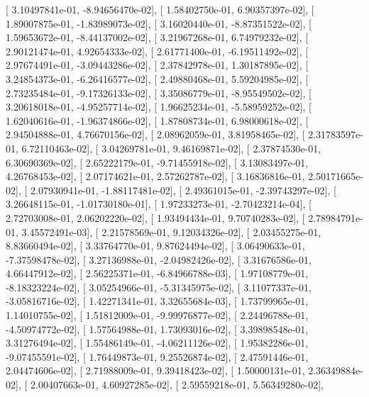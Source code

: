 \documentclass{article}
\begin{document}
       [  3.10497841e-01,  -8.94656470e-02],
       [  1.58402750e-01,   6.90357397e-02],
       [  1.89007875e-01,  -1.83989073e-02],
       [  3.16020440e-01,  -8.87351522e-02],
       [  1.59653672e-01,  -8.44137002e-02],
       [  3.21967268e-01,   6.74979232e-02],
       [  2.90121474e-01,   4.92654333e-02],
       [  2.61771400e-01,  -6.19511492e-02],
       [  2.97674491e-01,  -3.09443286e-02],
       [  2.37842978e-01,   1.30187895e-02],
       [  3.24854373e-01,  -6.26416577e-02],
       [  2.49880468e-01,   5.59204985e-02],
       [  2.73235484e-01,  -9.17326133e-02],
       [  3.35086779e-01,  -8.95549502e-02],
       [  3.20618018e-01,  -4.95257714e-02],
       [  1.96625234e-01,  -5.58959252e-02],
       [  1.62040616e-01,  -1.96374866e-02],
       [  1.87808734e-01,   6.98000618e-02],
       [  2.94504888e-01,   4.76670156e-02],
       [  2.08962059e-01,   3.81958465e-02],
       [  2.31783597e-01,   6.72110463e-02],
       [  3.04269781e-01,   9.46169871e-02],
       [  2.37874530e-01,   6.30690369e-02],
       [  2.65222179e-01,  -9.71455918e-02],
       [  3.13083497e-01,   4.26768453e-02],
       [  2.07174621e-01,   2.57262787e-02],
       [  3.16836816e-01,   2.50171665e-02],
       [  2.07930941e-01,  -1.88117481e-02],
       [  2.49361015e-01,  -2.39743297e-02],
       [  3.26648115e-01,  -1.01730180e-01],
       [  1.97233273e-01,  -2.70423214e-04],
       [  2.72703008e-01,   2.06202220e-02],
       [  1.93494434e-01,   9.70740283e-02],
       [  2.78984791e-01,   3.45572491e-03],
       [  2.21578569e-01,   9.12034326e-02],
       [  2.03455275e-01,   8.83660494e-02],
       [  3.33764770e-01,   9.87624494e-02],
       [  3.06490633e-01,  -7.37598478e-02],
       [  3.27136988e-01,  -2.04982426e-02],
       [  3.31676586e-01,   4.66447912e-02],
       [  2.56225371e-01,  -6.84966788e-03],
       [  1.97108779e-01,  -8.18323224e-02],
       [  3.05254966e-01,  -5.31345975e-02],
       [  3.11077337e-01,  -3.05816716e-02],
       [  1.42271341e-01,   3.32655684e-03],
       [  1.73799965e-01,   1.14010755e-02],
       [  1.51812009e-01,  -9.99976877e-02],
       [  2.24496788e-01,  -4.50974772e-02],
       [  1.57564988e-01,   1.73093016e-02],
       [  3.39898548e-01,   3.31276494e-02],
       [  1.55486149e-01,  -4.06211126e-02],
       [  1.95382286e-01,  -9.07455591e-02],
       [  1.76449873e-01,   9.25526874e-02],
       [  2.47591446e-01,   2.04474606e-02],
       [  2.71988009e-01,   9.39418423e-02],
       [  1.50000131e-01,   2.36349884e-02],
       [  2.00407663e-01,   4.60927285e-02],
       [  2.59559218e-01,   5.56349280e-02],
\end{document}
